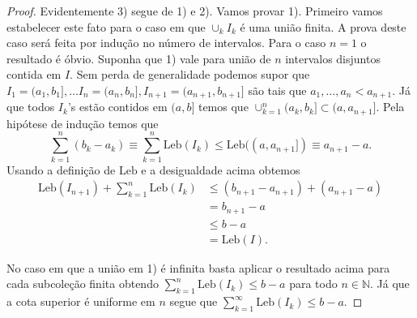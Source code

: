 \begin{proof}
Evidentemente 3) segue de 1) e 2).
Vamos provar 1). Primeiro vamos 
estabelecer este fato para o caso 
em que $\cup_{k} I_k$ é uma união finita. 
A prova deste caso será feita por indução 
no número de intervalos.
Para o caso $n=1$ o resultado é óbvio. 
Suponha que 1) vale para união de $n$ intervalos
disjuntos contida em $I$. Sem perda de generalidade 
podemos supor que 
$I_1=(a_1,b_1],\ldots I_n=(a_n,b_n], I_{n+1}=(a_{n+1},b_{n+1}]$
são tais que $a_1,\ldots, a_n <a_{n+1}$. 
Já que todos $I_k$'s estão contidos em $(a,b]$
temos que 
$\cup_{k=1}^n (a_k,b_k]\subset (a,a_{n+1}]$.
Pela hipótese de indução temos que
\[
\sum_{k=1}^n (b_k-a_k)
\equiv
\sum_{k=1}^n \mathrm{Leb}(I_k)
\leq
\mathrm{Leb}((a,a_{n+1}])
\equiv
a_{n+1}-a.
\] 
Usando a definição de $\mathrm{Leb}$ e a desigualdade 
acima obtemos
\begin{align*}
\mathrm{Leb}(I_{n+1})
+ 
{\textstyle \sum_{k=1}^n \mathrm{Leb}(I_k)}
&\leq
(b_{n+1}-a_{n+1})+(a_{n+1}-a)
\\
&=
b_{n+1}-a
\\
&\leq
b-a
\\
&=
\mathrm{Leb}(I).
\end{align*}

No caso em que a união em 1) é infinita basta aplicar o 
resultado acima para cada subcoleção finita obtendo 
$\sum_{k=1}^n \mathrm{Leb}(I_k)\leq b-a$ para todo $n\in\mathbb{N}$.
Já que a cota superior é uniforme em $n$ segue que 
$\sum_{k=1}^{\infty} \mathrm{Leb}(I_k)\leq b-a$.




\end{proof}
